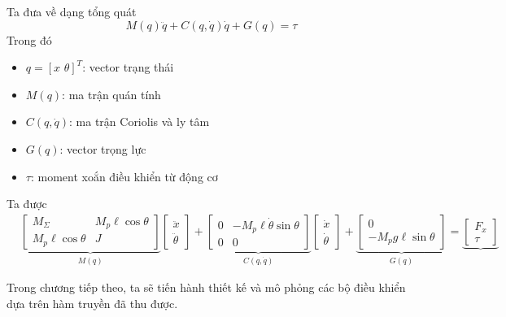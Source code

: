             Ta đưa về dạng tổng quát
            \begin{equation}
                M(q) \ddot{q} + C (q, \dot{q}) \dot{q} + G(q) = \tau
            \end{equation}
            Trong đó
            \begin{itemize}
                \item $q = [x \,\, \theta]^T$: vector trạng thái
                \item $M(q)$: ma trận quán tính
                \item $C(q, \dot{q})$: ma trận Coriolis và ly tâm
                \item $G(q)$: vector trọng lực
                \item $\tau$: moment xoắn điều khiển từ động cơ
            \end{itemize} 
            Ta được
            \begin{align*}
                &\underbrace{
                \begin{bmatrix}
                M_\Sigma & M_p \ell \cos \theta\\
                M_p \ell  \cos \theta & J
                \end{bmatrix}
                }_{M(q)}
                \begin{bmatrix}
                \ddot{x} \\ \ddot{\theta}
                \end{bmatrix}
                +
                \underbrace{
                \begin{bmatrix}
                0 & -M_p \ell \dot{\theta} \sin \theta \\
                0 & 0
                \end{bmatrix}
                }_{C(q, \dot{q})}
                \begin{bmatrix}
                \dot{x} \\ \dot{\theta}
                \end{bmatrix} 
                +
                \underbrace{
                \begin{bmatrix}
                0 \\
                -M_p g \ell \sin \theta
                \end{bmatrix}
                }_{G(q)}
                =
                \underbrace{
                \begin{bmatrix}
                F_x \\
                \tau
                \end{bmatrix}
                }
            \end{align*}
        
        Trong chương tiếp theo, ta sẽ tiến hành thiết kế và mô phỏng các bộ điều khiển dựa trên hàm truyền đã thu được.
            
        
       